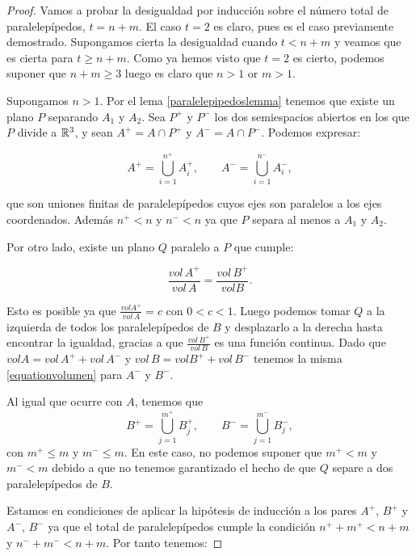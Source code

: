 \begin{proof}
Vamos a probar la desigualdad por inducción sobre el número total de paralelepípedos, $t = n + m$.
El caso $t=2$ es claro, pues es el caso previamente demostrado.
Supongamos cierta la desigualdad cuando $t < n + m$ y veamos que es cierta para $t \geq n + m$. Como ya hemos visto que $t=2$ es cierto, podemos suponer que $n + m \geq 3$ luego es claro que $n > 1$ or $m > 1$.

Supongamos $n > 1$. Por el lema \ref{paralelepipedoslemma} tenemos que existe un plano $P$ separando $A_1$ y $A_2$. Sea $P^+$ y $P^-$ los dos semiespacios abiertos en los que $P$ divide a $\mathbb{R}^3$, y sean $A^+ = A \cap P^+$ y $A^- = A \cap P^-$. Podemos expresar:

\begin{equation*}
    A^+ = \displaystyle\bigcup_{i=1}^{n^+} A_i^+, \qquad A^- = \displaystyle\bigcup_{i=1}^{n^-} A_i^-,
\end{equation*}

que son uniones finitas de paralelepípedos cuyos ejes son paralelos a los ejes coordenados. Además $n^+ < n$ y $n^- < n$ ya que $P$ separa al menos a $A_1$ y $A_2$.

Por otro lado, existe un plano $Q$ paralelo a $P$ que cumple:

\begin{equation}\label{equationvolumen}
    \frac{vol \, A^+}{vol \, A} = \frac{vol \, B^+}{vol B}.
\end{equation}

Esto es posible ya que $\frac{vol A^+}{vol \, A} = c$ con $0 < c < 1$. Luego podemos tomar $Q$ a la izquierda de todos los paralelepípedos de $B$ y desplazarlo a la derecha hasta encontrar la igualdad, gracias a que $\frac{vol \, B^+}{vol \, B}$ es una función continua.
Dado que $vol A = vol \, A^+ + vol \, A^-$ y $vol \, B = vol B^+ + vol \, B^-$ tenemos la misma \ref{equationvolumen} para $A^-$ y $B^-$.

Al igual que ocurre con $A$, tenemos que 
%
\begin{equation*}
    B^+ = \displaystyle\bigcup_{j=1}^{m^+} B_j^+, \qquad B^- = \displaystyle\bigcup_{j=1}^{m^-} B_j^-,
\end{equation*}
%
con $m^+ \leq m$ y $m^- \leq m$. En este caso, no podemos suponer que $m^+ < m$ y $m^- < m$ debido a que no tenemos garantizado el hecho de que $Q$ separe a dos paralelepípedos de $B$.

Estamos en condiciones de aplicar la hipótesis de inducción a los pares $A^+$, $B^+$ y $A^-$, $B^-$ ya que el total de paralelepípedos cumple la condición $n^+ + m^+ < n + m$ y $n^- + m^- < n + m$. Por tanto tenemos:


\end{proof}
